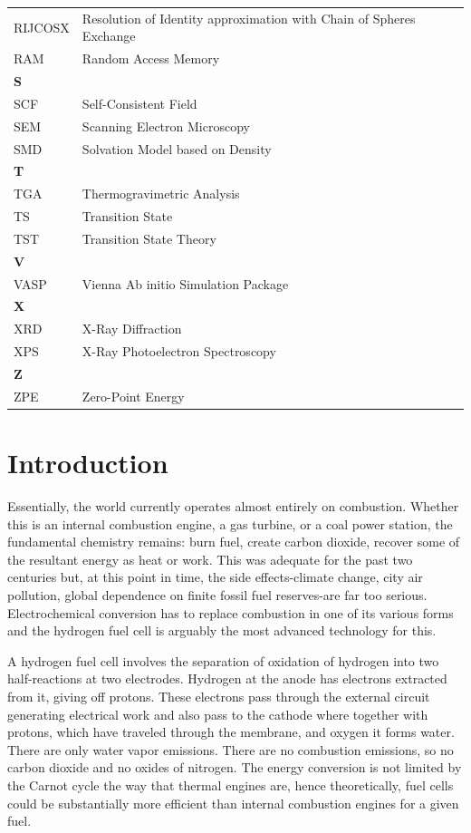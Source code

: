 \documentclass[12pt,a4paper]{report}
\begin{document}
\begin{center}
\begin{longtable}{p{2.5cm} p{12cm}}
\hline
RIJCOSX & Resolution of Identity approximation with Chain of Spheres Exchange \\
RAM & Random Access Memory \\
\hline
\multicolumn{2}{l}{\textbf{S}} \\
\hline
SCF & Self-Consistent Field \\
SEM & Scanning Electron Microscopy \\
SMD & Solvation Model based on Density \\
\hline
\multicolumn{2}{l}{\textbf{T}} \\
\hline
TGA & Thermogravimetric Analysis \\
TS & Transition State \\
TST & Transition State Theory \\
\hline
\multicolumn{2}{l}{\textbf{V}} \\
\hline
VASP & Vienna Ab initio Simulation Package \\
\hline
\multicolumn{2}{l}{\textbf{X}} \\
\hline
XRD & X-Ray Diffraction \\
XPS & X-Ray Photoelectron Spectroscopy \\
\hline
\multicolumn{2}{l}{\textbf{Z}} \\
\hline
ZPE & Zero-Point Energy \\
\hline
\end{longtable}
\end{center}
\clearpage



\chapter{Introduction}

Essentially, the world currently operates almost entirely on combustion. Whether this is an internal combustion engine, a gas turbine, or a coal power station, the fundamental chemistry remains: burn fuel, create carbon dioxide, recover some of the resultant energy as heat or work. This was adequate for the past two centuries but, at this point in time, the side effects-climate change, city air pollution, global dependence on finite fossil fuel reserves-are far too serious. Electrochemical conversion has to replace combustion in one of its various forms and the hydrogen fuel cell is arguably the most advanced technology for this. \cite{1,2}

A hydrogen fuel cell involves the separation of oxidation of hydrogen into two half-reactions at two electrodes. Hydrogen at the anode has electrons extracted from it, giving off protons. These electrons pass through the external circuit generating electrical work and also pass to the cathode where together with protons, which have traveled through the membrane, and oxygen it forms water. There are only water vapor emissions. There are no combustion emissions, so no carbon dioxide and no oxides of nitrogen. The energy conversion is not limited by the Carnot cycle the way that thermal engines are, hence theoretically, fuel cells could be substantially more efficient than internal combustion engines for a given fuel\cite{1,2}.
\end{document}
